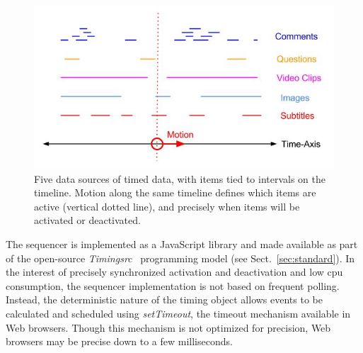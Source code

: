 \begin{figure}[h]
\centering
\includegraphics[scale=.3]{fig/sequencer.jpg}
\caption{Five data sources of timed data, with items tied to intervals on the timeline. Motion along the same timeline defines which items are active (vertical dotted line), and precisely when items will be activated or deactivated.}
\label{fig:sequencer}
\end{figure}



The sequencer is implemented as a JavaScript library and made available as
part of the open-source \emph{Timingsrc}~\cite{timingsrc} programming model
(see Sect.~\ref{sec:standard}). In the interest of precisely synchronized
activation and deactivation and low cpu consumption, the sequencer
implementation is not based on frequent polling. Instead, the deterministic
nature of the timing object allows events to be calculated and scheduled using
\emph{setTimeout}, the timeout mechanism available in Web browsers. Though
this mechanism is not optimized for precision, Web browsers may be precise
down to a few milliseconds.







